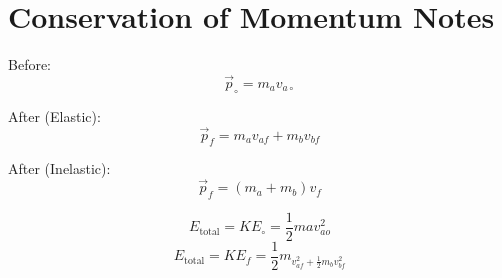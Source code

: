 \documentclass[fleqn]{article}
\begin{document}
\setlength{\mathindent}{0pt}
\section*{Conservation of Momentum Notes}
Before:
\[ \vec{p}_{\circ}=m_av _{a\circ}    \]

After (Elastic):
\[ \vec{p}_{f} = m_av _{af} + m_bv _{bf}     \]

After (Inelastic):
\[ \vec{p}_{f} =  \left( m_a+m_b \right) v_f \]

\[ E _{\text{total} } =KE _{\circ} = \frac{1}{2} ma{v _{ao}^2 } \]
\[ E _{\text{total} } = KE_f = \frac{1}{2} m_{v _{af}^2 + \frac{1}{2} m_b {v _{bf}^2 } } \]
\end{document}

